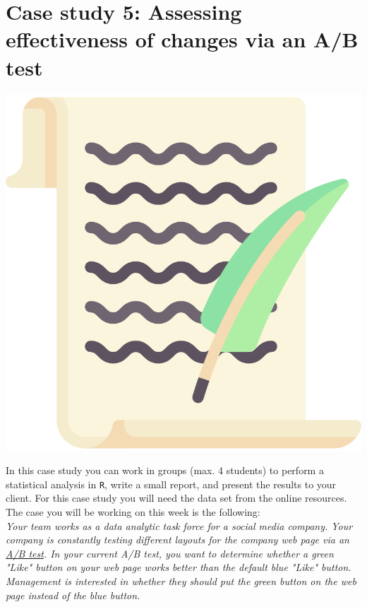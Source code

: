 
\begin{minipage}{0.8\textwidth}
\section{Case study 5: Assessing effectiveness of changes via an A/B test}
\end{minipage}%
\hfill%
\begin{minipage}{0.1\textwidth}
\includegraphics[width=\linewidth]{Files/Images/lettericon.pdf}
\end{minipage}
\vspace*{.1cm}

In this case study you can work in groups (max. 4 students) to perform a statistical analysis in \texttt{R}, write a small report, and present the results to your client. For this case study you will need the data set  from the online resources. The case you will be working on this week is the following: \\

\textit{Your team works as a data analytic task force for a social media company. Your company is constantly testing different layouts for the company web page via an \href{https://en.wikipedia.org/wiki/A/B_testing}{A/B test}. In your current A/B test, you want to determine whether a green "Like" button on your web page works better than the default blue "Like" button. Management is interested in whether they should put the green button on the web page instead of the blue button.} \\

